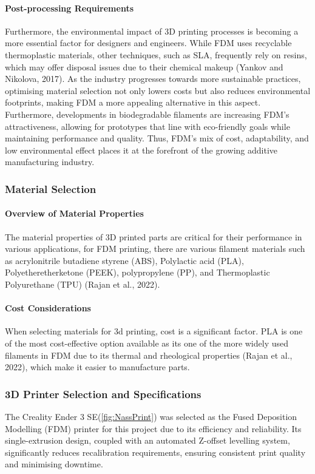 \paragraph{Post-processing Requirements}

Furthermore, the environmental impact of 3D printing processes is becoming a more essential factor for designers and engineers. 
While FDM uses recyclable thermoplastic materials, other techniques, such as SLA, frequently rely on resins, which may offer disposal issues due to their chemical makeup (Yankov and Nikolova, 2017). 
As the industry progresses towards more sustainable practices, optimising material selection not only lowers costs but also reduces environmental footprints, making FDM a more appealing alternative in this aspect. 
Furthermore, developments in biodegradable filaments are increasing FDM's attractiveness, allowing for prototypes that line with eco-friendly goals while maintaining performance and quality. 
Thus, FDM's mix of cost, adaptability, and low environmental effect places it at the forefront of the growing additive manufacturing industry.

\subsubsection{Material Selection}
\paragraph{Overview of Material Properties}
The material properties of 3D printed parts are critical for their performance in various applications, for FDM printing, there are various filament materials such as acrylonitrile butadiene styrene (ABS), Polylactic acid (PLA), Polyetheretherketone (PEEK), polypropylene (PP), and Thermoplastic Polyurethane (TPU) (Rajan et al., 2022).

\paragraph{Cost Considerations}

When selecting materials for 3d printing, cost is a significant factor. 
PLA is one of the most cost-effective option available as its one of the more widely used filaments in FDM due to its thermal and rheological properties (Rajan et al., 2022), which make it easier to manufacture parts.

\subsubsection{3D Printer Selection and Specifications}
The Creality Ender 3 SE(\ref{fig:NassPrint}) was selected as the Fused Deposition Modelling (FDM) printer for this project due to its efficiency and reliability. 
Its single-extrusion design, coupled with an automated Z-offset levelling system, significantly reduces recalibration requirements, ensuring consistent print quality and minimising downtime. 

